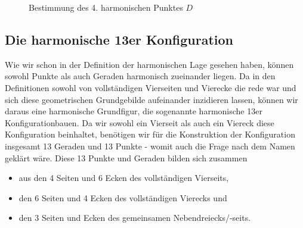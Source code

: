 \documentclass[12pt,a4paper]{article}
\begin{document}
\begin{figure} [htbp]
 \hfill
{}
\caption{Bestimmung des 4. harmonischen Punktes $D$}
\end{figure} 

\newpage
\subsection{Die harmonische 13er Konfiguration}
\label{subsec:harmonischeKonfiguration}

Wie wir schon in der Definition der harmonischen Lage gesehen haben, können sowohl Punkte als auch Geraden harmonisch zueinander liegen. Da in den Definitionen sowohl von vollständigen Vierseiten und Vierecke die rede war und sich diese geometrischen Grundgebilde aufeinander inzidieren lassen, können wir daraus eine harmonische Grundfigur, die sogenannte \glqq harmonische 13er Konfiguration\grqq bauen. Da wir sowohl ein Vierseit als auch ein Viereck diese Konfiguration beinhaltet, benötigen wir für die Konstruktion der Konfiguration insgesamt 13 Geraden und 13 Punkte - womit auch die Frage nach dem Namen geklärt wäre. Diese 13 Punkte und Geraden bilden sich zusammen

\begin{itemize}
\item[]aus den 4 Seiten und 6 Ecken des vollständigen Vierseits,
\item[]den 6 Seiten und 4 Ecken des vollständigen Vierecks und
\item[]den 3 Seiten und Ecken des gemeinsamen Nebendreiecks/-seits.
\end{itemize}
\end{document}
